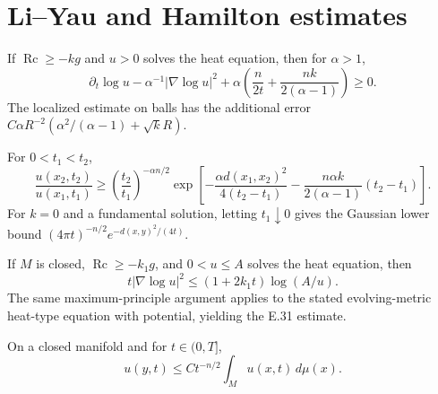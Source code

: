 \section{Li--Yau and Hamilton estimates}

\begin{theorem}
\label{thm:chow-ii-li-yau-estimate}
If $\operatorname{Rc}\ge-kg$ and $u>0$ solves the heat equation, then for
$\alpha>1$,
\[
\partial_t\log u-\alpha^{-1}|\nabla\log u|^2
+\alpha\left(\frac n{2t}+\frac{nk}{2(\alpha-1)}\right)\ge0.
\]
The localized estimate on balls has the additional error
$C\alpha R^{-2}(\alpha^2/(\alpha-1)+\sqrt{k}R)$.
\end{theorem}

\begin{theorem}
\label{thm:chow-ii-path-harnack}
For $0<t_1<t_2$,
\[
\frac{u(x_2,t_2)}{u(x_1,t_1)}\ge
\left(\frac{t_2}{t_1}\right)^{-\alpha n/2}
\exp\left[-\frac{\alpha d(x_1,x_2)^2}{4(t_2-t_1)}
-\frac{n\alpha k}{2(\alpha-1)}(t_2-t_1)\right].
\]
For $k=0$ and a fundamental solution, letting $t_1\downarrow0$ gives the
Gaussian lower bound $(4\pi t)^{-n/2}e^{-d(x,y)^2/(4t)}$.
\end{theorem}

\begin{theorem}
\label{thm:chow-ii-hamilton-gradient-estimate}
If $M$ is closed, $\operatorname{Rc}\ge-k_1g$, and $0<u\le A$ solves the
heat equation, then
\[
t|\nabla\log u|^2\le(1+2k_1t)\log(A/u).
\]
The same maximum-principle argument applies to the stated evolving-metric
heat-type equation with potential, yielding the E.31 estimate.
\end{theorem}

\begin{corollary}
\label{cor:chow-ii-heat-integral-pointwise}
On a closed manifold and for $t\in(0,T]$,
\[
u(y,t)\le Ct^{-n/2}\int_Mu(x,t)\,d\mu(x).
\]
\end{corollary}

